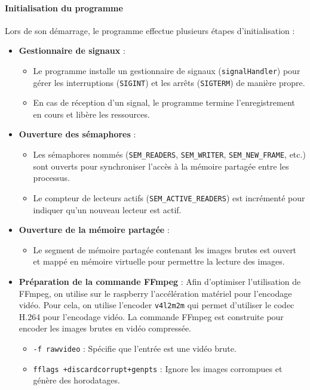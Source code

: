 \documentclass[a4paper, 11pt, french]{article}
\begin{document}
\paragraph{Initialisation du programme}
Lors de son démarrage, le programme effectue plusieurs étapes d'initialisation :
\begin{itemize}
    \item \textbf{Gestionnaire de signaux} : 
    \begin{itemize}
        \item Le programme installe un gestionnaire de signaux (\texttt{signalHandler}) pour gérer les interruptions (\texttt{SIGINT}) et les arrêts (\texttt{SIGTERM}) de manière propre.
        \item En cas de réception d'un signal, le programme termine l'enregistrement en cours et libère les ressources.
    \end{itemize}
    \item \textbf{Ouverture des sémaphores} :
    \begin{itemize}
        \item Les sémaphores nommés (\texttt{SEM\_READERS}, \texttt{SEM\_WRITER}, \texttt{SEM\_NEW\_FRAME}, etc.) sont ouverts pour synchroniser l'accès à la mémoire partagée entre les processus.
        \item Le compteur de lecteurs actifs (\texttt{SEM\_ACTIVE\_READERS}) est incrémenté pour indiquer qu'un nouveau lecteur est actif.
    \end{itemize}
    \item \textbf{Ouverture de la mémoire partagée} :
    \begin{itemize}
        \item Le segment de mémoire partagée contenant les images brutes est ouvert et mappé en mémoire virtuelle pour permettre la lecture des images.
    \end{itemize}
    \item \textbf{Préparation de la commande FFmpeg} :
    Afin d'optimiser l'utilisation de FFmpeg, on utilise sur le raspberry l'accélération matériel pour l'encodage vidéo. Pour cela, on utilise l'encoder \texttt{v4l2m2m} \cite{manFFmpegV4l2} qui permet d'utiliser le codec H.264 pour l'encodage vidéo. La commande FFmpeg est construite pour encoder les images brutes en vidéo compressée. 
    \begin{itemize}
        \item \texttt{-f rawvideo} : Spécifie que l'entrée est une vidéo brute.
        \item \texttt{fflags +discardcorrupt+genpts} : Ignore les images corrompues et génère des horodatages.

\end{itemize}
\end{itemize}
\end{document}
